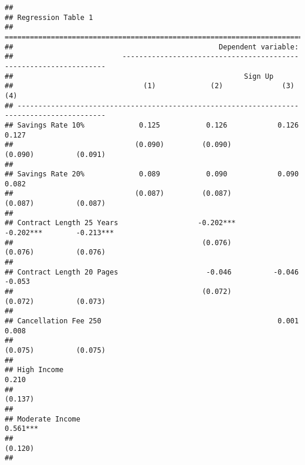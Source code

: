 \documentclass[
]{article}
\begin{document}
\begin{verbatim}
## 
## Regression Table 1
## ===========================================================================================
##                                                 Dependent variable:                        
##                          ------------------------------------------------------------------
##                                                       Sign Up                              
##                               (1)             (2)              (3)              (4)        
## -------------------------------------------------------------------------------------------
## Savings Rate 10%             0.125           0.126            0.126            0.127       
##                             (0.090)         (0.090)          (0.090)          (0.091)      
##                                                                                            
## Savings Rate 20%             0.089           0.090            0.090            0.082       
##                             (0.087)         (0.087)          (0.087)          (0.087)      
##                                                                                            
## Contract Length 25 Years                   -0.202***        -0.202***        -0.213***     
##                                             (0.076)          (0.076)          (0.076)      
##                                                                                            
## Contract Length 20 Pages                     -0.046          -0.046            -0.053      
##                                             (0.072)          (0.072)          (0.073)      
##                                                                                            
## Cancellation Fee 250                                          0.001            0.008       
##                                                              (0.075)          (0.075)      
##                                                                                            
## High Income                                                                    0.210       
##                                                                               (0.137)      
##                                                                                            
## Moderate Income                                                               0.561***     
##                                                                               (0.120)      
##                                                                                            

\end{verbatim}
\end{document}
